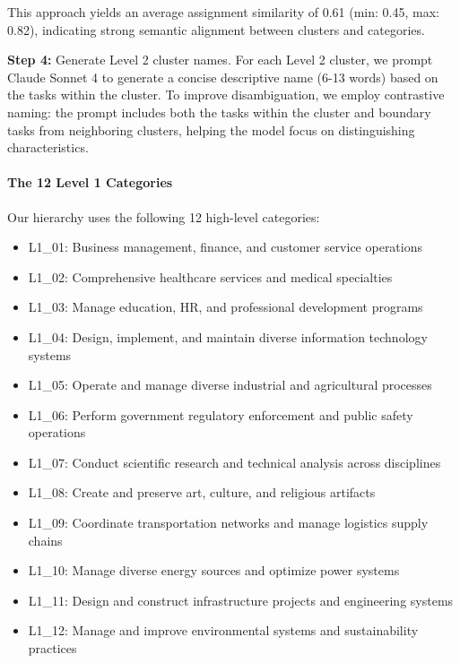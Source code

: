 \documentclass[manuscript,screen,nonacm,oneside]{acmart}
\begin{document}
This approach yields an average assignment similarity of 0.61 (min: 0.45, max: 0.82), indicating strong semantic alignment between clusters and categories.

\textbf{Step 4:} Generate Level 2 cluster names. For each Level 2 cluster, we prompt Claude Sonnet 4 to generate a concise descriptive name (6-13 words) based on the tasks within the cluster. To improve disambiguation, we employ contrastive naming: the prompt includes both the tasks within the cluster and boundary tasks from neighboring clusters, helping the model focus on distinguishing characteristics.

\paragraph{The 12 Level 1 Categories}\label{the-12-level-1-categories}

Our hierarchy uses the following 12 high-level categories:

\begin{itemize}
\item
 L1\_01: Business management, finance, and customer service operations
\item
 L1\_02: Comprehensive healthcare services and medical specialties
\item
 L1\_03: Manage education, HR, and professional development programs
\item
 L1\_04: Design, implement, and maintain diverse information technology systems
\item
 L1\_05: Operate and manage diverse industrial and agricultural processes
\item
 L1\_06: Perform government regulatory enforcement and public safety operations
\item
 L1\_07: Conduct scientific research and technical analysis across disciplines
\item
 L1\_08: Create and preserve art, culture, and religious artifacts
\item
 L1\_09: Coordinate transportation networks and manage logistics supply chains
\item
 L1\_10: Manage diverse energy sources and optimize power systems
\item
 L1\_11: Design and construct infrastructure projects and engineering systems
\item
 L1\_12: Manage and improve environmental systems and sustainability practices
\end{itemize}
\end{document}
